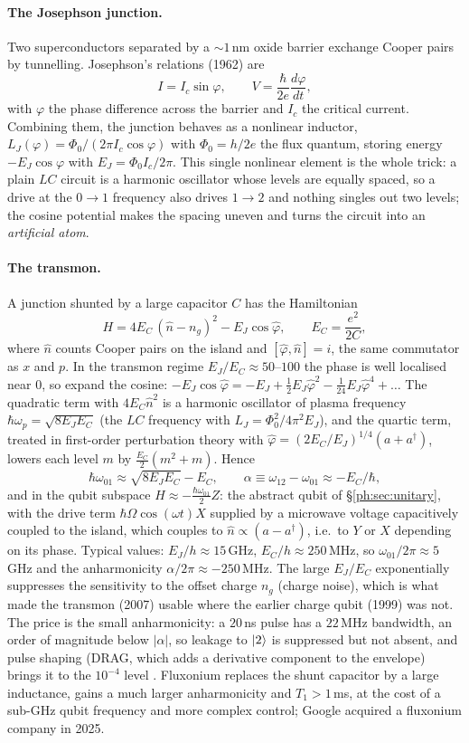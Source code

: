 \paragraph{The Josephson junction.} Two superconductors separated by a $\sim1$\,nm oxide barrier
exchange Cooper pairs by tunnelling. Josephson's relations (1962) are
\[ I=I_c\sin\varphi,\qquad V=\frac{\hbar}{2e}\frac{d\varphi}{dt}, \]
with $\varphi$ the phase difference across the barrier and $I_c$ the critical current. Combining
them, the junction behaves as a nonlinear inductor,
$L_J(\varphi)=\Phi_0/(2\pi I_c\cos\varphi)$ with $\Phi_0=h/2e$ the flux quantum, storing energy
$-E_J\cos\varphi$ with $E_J=\Phi_0I_c/2\pi$. This single nonlinear element is the whole trick: a
plain $LC$ circuit is a harmonic oscillator whose levels are equally spaced, so a drive at the
$0\to1$ frequency also drives $1\to2$ and nothing singles out two levels; the cosine potential
makes the spacing uneven and turns the circuit into an \emph{artificial atom}.

\paragraph{The transmon.} A junction shunted by a large capacitor $C$ has the Hamiltonian
\[ H=4E_C\,(\hat n-n_g)^2-E_J\cos\hat\varphi,\qquad E_C=\frac{e^2}{2C}, \]
where $\hat n$ counts Cooper pairs on the island and $[\hat\varphi,\hat n]=i$, the same
commutator as $x$ and $p$. In the transmon regime $E_J/E_C\approx50$--$100$ the phase is
well localised near $0$, so expand the cosine:
$-E_J\cos\hat\varphi=-E_J+\tfrac12E_J\hat\varphi^2-\tfrac1{24}E_J\hat\varphi^4+\dots$ The
quadratic term with $4E_C\hat n^2$ is a harmonic oscillator of plasma frequency
$\hbar\omega_p=\sqrt{8E_JE_C}$ (the $LC$ frequency with $L_J=\Phi_0^2/4\pi^2E_J$), and the
quartic term, treated in first-order perturbation theory with
$\hat\varphi=(2E_C/E_J)^{1/4}(a+a^\dagger)$, lowers each level $m$ by
$\tfrac{E_C}2(m^2+m)$. Hence
\[ \hbar\omega_{01}\approx\sqrt{8E_JE_C}-E_C,\qquad
   \alpha\equiv\omega_{12}-\omega_{01}\approx-E_C/\hbar , \]
and in the qubit subspace $H\approx-\tfrac{\hbar\omega_{01}}2Z$: the abstract qubit of
\S\ref{ph:sec:unitary}, with the drive term $\hbar\Omega\cos(\omega t)X$ supplied by a microwave
voltage capacitively coupled to the island, which couples to $\hat n\propto(a-a^\dagger)$, i.e.\ to
$Y$ or $X$ depending on its phase.
Typical values: $E_J/h\approx15$\,GHz, $E_C/h\approx250$\,MHz, so $\omega_{01}/2\pi\approx5$\,GHz
and the anharmonicity $\alpha/2\pi\approx-250$\,MHz. The large $E_J/E_C$ exponentially suppresses
the sensitivity to the offset charge $n_g$ (charge noise), which is what made the transmon
(2007) usable where the earlier charge qubit (1999) was not. The price is the small anharmonicity:
a $20$\,ns pulse has a $22$\,MHz bandwidth, an order of magnitude below $|\alpha|$, so leakage
to $\lvert 2 \rangle$ is suppressed but not absent, and pulse shaping (DRAG, which adds a derivative
component to the envelope) brings it to the $10^{-4}$ level \cite{ph:uqt26}. Fluxonium replaces
the shunt capacitor by a large inductance, gains a much larger anharmonicity and $T_1>1$\,ms, at
the cost of a sub-GHz qubit frequency and more complex control; Google acquired a fluxonium
company in 2025.

